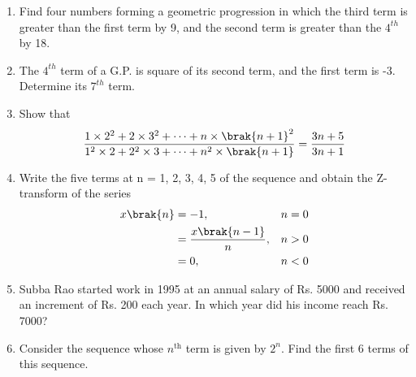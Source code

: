 	\begin{enumerate}[label=\thesection.\arabic*,ref=\thesection.\theenumi]

\item  
Find four numbers forming a geometric progression in which the third term is greater than the first term by 9, and the second term is greater than the $4^{th}$ by 18.\\
\solution

\pagebreak

\item The $4^{th}$ term of a G.P. is square of its second term, and the first term is -3. Determine its $7^{th}$ term.\\  

\solution 


\pagebreak

\item Show that
\begin{equation}
    \frac{1\times2^2 + 2\times3^2 + \dots + n\times\brak{n+1}^2}{1^2\times2 + 2^2\times3 +\dots + n^2\times\brak{n+1}}  = \frac{3n+5}{3n+1}\notag
\end{equation}

\solution 


\pagebreak

\item Write the five terms at n = 1, 2, 3, 4, 5 of the sequence and obtain the Z-transform of the series
\begin{align}
    x \brak{n} &=  -1, & n = 0 \\
    &=   \frac{x \brak{n-1}}{n}, & n > 0\\
    &=   0, & n < 0 
\end{align}

\solution


\pagebreak


\item Subba Rao started work in 1995 at an annual salary of Rs. 5000 and received an increment of Rs. 200 each year. In which year did his income reach Rs. 7000?

\solution



\item Consider the sequence whose $n^\text{th}$ term is given by \(2^n\). Find the first 6 terms of this sequence.

\solution


\end{enumerate}
